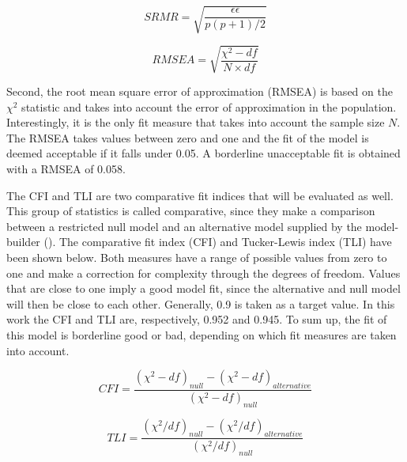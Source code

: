 \documentclass[11pt]{article}
\begin{document}
\begin{minipage}{0.48\linewidth}
\begin{equation}
\label{eq:srmr}
  SRMR = \sqrt{\dfrac{\epsilon \epsilon}{p(p+1)/2}}
\end{equation}
\end{minipage}
\begin{minipage}{0.48\linewidth}
\begin{equation}
\label{eq:rmsea}
  RMSEA = \sqrt{\dfrac{\chi^2 - df}{N \times df}}
\end{equation}
\end{minipage}

Second, the root mean square error of approximation (RMSEA) is based on the
$\chi^2$ statistic and takes into account the error of approximation in the
population. Interestingly, it is the only fit measure that takes into account
the sample size $N$. The RMSEA takes values between zero and one and the fit of
the model is deemed acceptable if it falls under 0.05. A borderline unacceptable 
fit is obtained with a RMSEA of 0.058.

The CFI and TLI are two comparative fit indices that will be evaluated as well.
This group of statistics is called comparative, since they make a comparison
between a restricted null model and an alternative model supplied by
the model-builder (\cite{brown2015}). The comparative fit index (CFI) and
Tucker-Lewis index (TLI) have been shown below. Both measures have a range of
possible values from zero to one and make a correction for complexity through
the degrees of freedom. Values that are close to one imply a good model fit,
since the alternative and null model will then be close to each other.
Generally, 0.9 is taken as a target value. In this work the CFI and TLI
are, respectively, 0.952 and 0.945. To sum up, the fit of this model is
borderline good or bad, depending on which fit measures are taken into account.

\begin{minipage}{0.48\linewidth}
\begin{equation}
\label{eq:cfi}
    CFI = \dfrac{(\chi^2 - df)_{null} - (\chi^2 - df)_{alternative}}{(\chi^2 - df)_{null}}
\end{equation}
\end{minipage}
\begin{minipage}{0.48\linewidth}
\begin{equation}
\label{eq:tli}
    TLI = \dfrac{(\chi^2 / df)_{null} - (\chi^2 / df)_{alternative}}{(\chi^2 / df)_{null}}
\end{equation}
\end{minipage}
\end{document}
